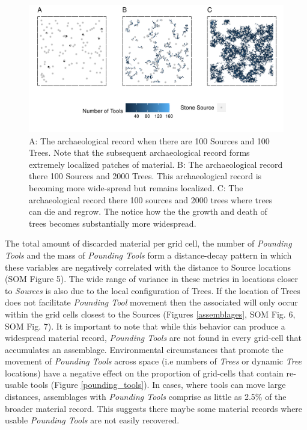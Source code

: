 \documentclass[9pt,twocolumn,twoside,]{pnas-new}
\begin{document}
\begin{figure}
\includegraphics[width=6.5in]{Reeves_et_al_2021_Panda_ABM_files/figure-latex/figure 3-1.pdf}
\caption{A: The archaeological record when there are 100 Sources and 100 Trees. Note that the subsequent archaeological record forms extremely localized patches of material. B: The archaeological record there 100 Sources and 2000 Trees. This archaeological record is becoming more wide-spread but remains localized. C: The archaeological record there 100 sources and 2000 trees where trees can die and regrow. The notice how the the growth and death of trees becomes substantially more widespread.}
\label{distribution}
\end{figure}

The total amount of discarded material per grid cell, the number of
\emph{Pounding Tools} and the mass of \emph{Pounding Tools} form a
distance-decay pattern in which these variables are negatively
correlated with the distance to Source locations (SOM Figure 5). The
wide range of variance in these metrics in locations closer to
\emph{Sources} is also due to the local configuration of Trees. If the
location of Trees does not facilitate \emph{Pounding Tool} movement then
the associated will only occur within the grid cells closest to the
Sources (Figures \ref{assemblages}, SOM Fig. 6, SOM Fig. 7). It is
important to note that while this behavior can produce a widespread
material record, \emph{Pounding Tools} are not found in every grid-cell
that accumulates an assemblage. Environmental circumstances that promote
the movement of \emph{Pounding Tools} across space (i.e numbers of
\emph{Trees} or dynamic \emph{Tree} locations) have a negative effect on
the proportion of grid-cells that contain re-usable tools (Figure
\ref{pounding_tools}). In cases, where tools can move large distances,
assemblages with \emph{Pounding Tools} comprise as little as 2.5\% of
the broader material record. This suggests there maybe some material
records where usable \emph{Pounding Tools} are not easily recovered.
\end{document}

